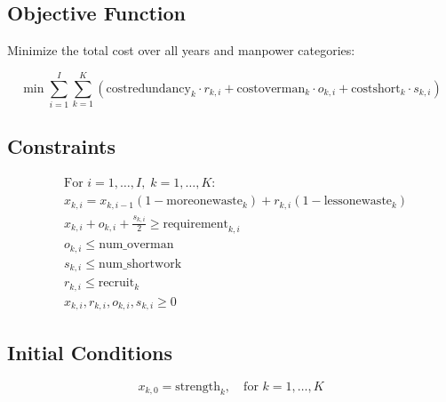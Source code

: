 \documentclass{article}
\begin{document}
\subsection*{Objective Function}
Minimize the total cost over all years and manpower categories:

\[
\min \sum_{i=1}^{I} \sum_{k=1}^{K} \left( \text{costredundancy}_k \cdot r_{k, i} + \text{costoverman}_k \cdot o_{k, i} + \text{costshort}_k \cdot s_{k, i} \right)
\]

\subsection*{Constraints}
\begin{align}
    & \text{For } i = 1, \ldots, I, \; k = 1, \ldots, K: \nonumber \\
    & x_{k, i} = x_{k, i-1} (1 - \text{moreonewaste}_k) + r_{k, i} (1 - \text{lessonewaste}_k) \label{eq:staffing_level} \\
    & x_{k, i} + o_{k, i} + \frac{s_{k, i}}{2} \geq \text{requirement}_{k, i} \label{eq:requirement} \\
    & o_{k, i} \leq \text{num\_overman} \label{eq:overman} \\
    & s_{k, i} \leq \text{num\_shortwork} \label{eq:shortwork} \\
    & r_{k, i} \leq \text{recruit}_{k} \label{eq:recruit_limit} \\
    & x_{k, i}, r_{k, i}, o_{k, i}, s_{k, i} \geq 0 \label{eq:non_negativity}
\end{align}

\subsection*{Initial Conditions}
\[
x_{k, 0} = \text{strength}_k, \quad \text{for } k = 1, \ldots, K
\]
\end{document}
